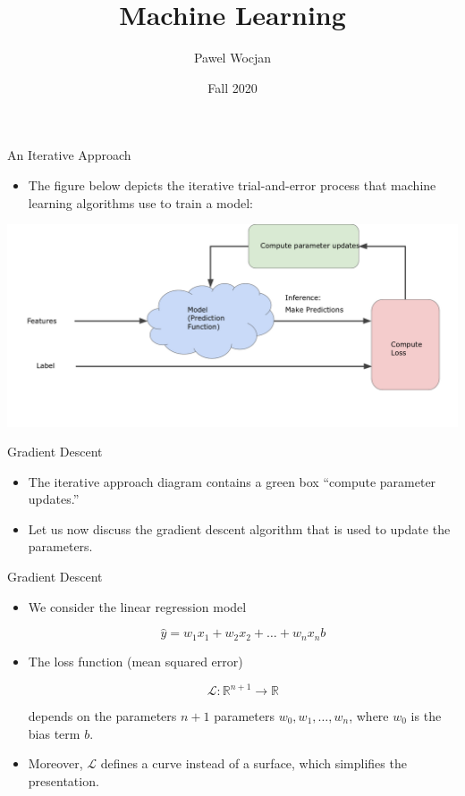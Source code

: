 \documentclass{beamer}
\title[ML]{Machine Learning}
\author{Pawel Wocjan}
\institute{University of Central Florida}
\date{Fall 2020}
\begin{document}
\begin{frame}
  \titlepage
\end{frame}


\begin{frame}{An Iterative Approach}
\begin{itemize}
    \item The figure below depicts the iterative trial-and-error process that machine learning algorithms use to train a model:
\end{itemize}

\bigskip
\includegraphics[width=\textwidth]{images/GradientDescentDiagram.png}
\end{frame}


\begin{frame}{Gradient Descent}
\begin{itemize}
\item The iterative approach diagram contains a green box ``compute parameter updates.'' 

\medskip    
\item Let us now discuss the gradient descent algorithm that is used to update the parameters.
\end{itemize}
\end{frame}


\begin{frame}{Gradient Descent}
\begin{itemize}
\item We consider the linear regression model 

$$\hat{y}=w_1 x_1 + w_2 x_2 + \ldots + w_n x_n b$$


\item The loss function (mean squared error)

$$\mathcal{L} : \mathbb{R}^{n+1} \rightarrow \mathbb{R}$$ 

depends on the parameters $n+1$ parameters $w_0, w_1, \ldots, w_n$, where $w_0$ is the bias term $b$.

\medskip
\item 
Moreover, $\mathcal{L}$ defines a curve instead of a surface, which simplifies the presentation.
\end{itemize}
\end{frame}
\end{document}
